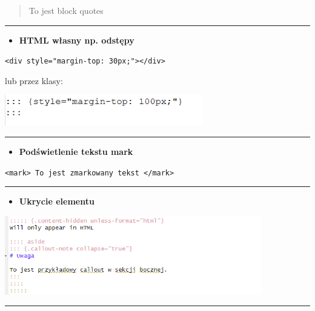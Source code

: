 \documentclass[
  a4paper,
  DIV=11,
  numbers=noendperiod,
  oneside,
  open=any]{scrreprt}
\providecommand{\tightlist}{%
  \setlength{\itemsep}{0pt}\setlength{\parskip}{0pt}}\usepackage{longtable,booktabs,array}
\begin{document}
\begin{quote}
To jest block quotes
\end{quote}

\begin{center}\rule{0.5\linewidth}{0.5pt}\end{center}

\begin{itemize}
\tightlist
\item
  \textbf{HTML własny np. odstępy}
\end{itemize}

\texttt{\textless{}div\ style="margin-top:\ 30px;"\textgreater{}\textless{}/div\textgreater{}}

lub przez klasy:

\includegraphics[width=3.40625in,height=\textheight]{images/_format_space.png}

\begin{center}\rule{0.5\linewidth}{0.5pt}\end{center}

\begin{itemize}
\tightlist
\item
  \textbf{Podświetlenie tekstu mark}
\end{itemize}

\texttt{\textless{}mark\textgreater{}\ To\ jest\ zmarkowany\ tekst\ \textless{}/mark\textgreater{}}

\begin{center}\rule{0.5\linewidth}{0.5pt}\end{center}

\begin{itemize}
\tightlist
\item
  \textbf{Ukrycie elementu}
\end{itemize}

\includegraphics[width=4.40625in,height=\textheight]{images/_format_hidden.png}

\begin{center}\rule{0.5\linewidth}{0.5pt}\end{center}
\end{document}
